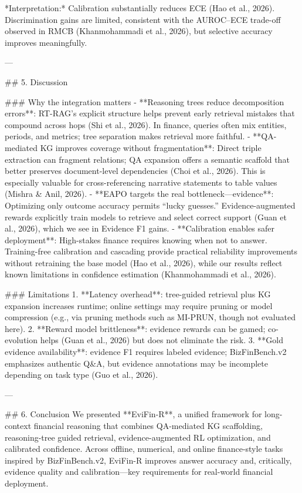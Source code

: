 *Interpretation:* Calibration substantially reduces ECE (Hao et al., 2026). Discrimination gains are limited, consistent with the AUROC–ECE trade-off observed in RMCB (Khanmohammadi et al., 2026), but selective accuracy improves meaningfully.

---

## 5. Discussion  

### Why the integration matters  
- **Reasoning trees reduce decomposition errors**: RT-RAG’s explicit structure helps prevent early retrieval mistakes that compound across hops (Shi et al., 2026). In finance, queries often mix entities, periods, and metrics; tree separation makes retrieval more faithful.  
- **QA-mediated KG improves coverage without fragmentation**: Direct triple extraction can fragment relations; QA expansion offers a semantic scaffold that better preserves document-level dependencies (Choi et al., 2026). This is especially valuable for cross-referencing narrative statements to table values (Mishra & Anil, 2026).  
- **EAPO targets the real bottleneck—evidence**: Optimizing only outcome accuracy permits “lucky guesses.” Evidence-augmented rewards explicitly train models to retrieve and select correct support (Guan et al., 2026), which we see in Evidence F1 gains.  
- **Calibration enables safer deployment**: High-stakes finance requires knowing when not to answer. Training-free calibration and cascading provide practical reliability improvements without retraining the base model (Hao et al., 2026), while our results reflect known limitations in confidence estimation (Khanmohammadi et al., 2026).

### Limitations  
1. **Latency overhead**: tree-guided retrieval plus KG expansion increases runtime; online settings may require pruning or model compression (e.g., via pruning methods such as MI-PRUN, though not evaluated here).  
2. **Reward model brittleness**: evidence rewards can be gamed; co-evolution helps (Guan et al., 2026) but does not eliminate the risk.  
3. **Gold evidence availability**: evidence F1 requires labeled evidence; BizFinBench.v2 emphasizes authentic Q&A, but evidence annotations may be incomplete depending on task type (Guo et al., 2026).  

---

## 6. Conclusion  
We presented **EviFin-R**, a unified framework for long-context financial reasoning that combines QA-mediated KG scaffolding, reasoning-tree guided retrieval, evidence-augmented RL optimization, and calibrated confidence. Across offline, numerical, and online finance-style tasks inspired by BizFinBench.v2, EviFin-R improves answer accuracy and, critically, evidence quality and calibration—key requirements for real-world financial deployment.

